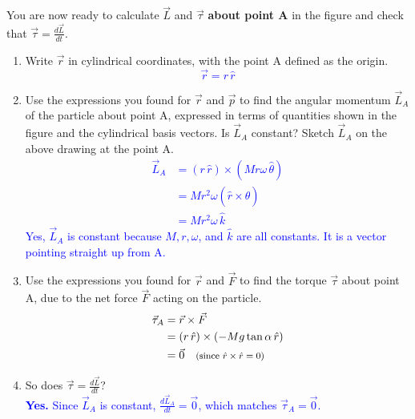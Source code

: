\documentclass[11pt, letterpaper, openany]{book}
\newenvironment{exercise}[1][Exercise]{%
  \tcolorbox[blanker, breakable, left=1em,
    before skip=1em, after skip=1em,
    borderline west={3pt}{0pt}{PhysNavy},
    colback=PhysCream,
    before upper={\textcolor{PhysNavy}{\sffamily\bfseries #1:}\space}
  ]%
}{%
  \endtcolorbox%
}
\begin{document}
\begin{exercise}[Exercise 9]
You are now ready to calculate $\vec{L}$ and $\vec{\tau}$ \textbf{about point A} in the figure and check that $\vec{\tau} = \frac{d\vec{L}}{dt}$.
\begin{enumerate}[label=(\alph*)]
    \item Write $\vec{r}$ in cylindrical coordinates, with the point A defined as the origin. \\
    \textcolor{blue}{\[ \vec{r} = r\,\hat{r} \]}
    
    \item Use the expressions you found for $\vec{r}$ and $\vec{p}$ to find the angular momentum $\vec{L}_A$ of the particle about point A, expressed in terms of quantities shown in the figure and the cylindrical basis vectors. Is $\vec{L}_A$ constant? Sketch $\vec{L}_A$ on the above drawing at the point A. \\
    \textcolor{blue}{
    \begin{align*}
        \vec{L}_A &= (r\,\hat{r}) \times (Mr\omega\,\hat{\theta}) \\
        &= Mr^2\omega (\hat{r} \times \hat{\theta}) \\
        &= Mr^2\omega\,\hat{k}
    \end{align*}
    Yes, $\vec{L}_A$ is constant because $M, r, \omega$, and $\hat{k}$ are all constants. It is a vector pointing straight up from A.
    }
    
    \item Use the expressions you found for $\vec{r}$ and $\vec{F}$ to find the torque $\vec{\tau}$ about point A, due to the net force $\vec{F}$ acting on the particle. \\
    \textcolor{blue}{
    \begin{align*}
        \vec{\tau}_A &= \vec{r} \times \vec{F} \\
        &= (r\,\hat{r}) \times (-Mg\tan\alpha\,\hat{r}) \\
        &= \vec{0} \quad \text{\footnotesize{(since $\hat{r} \times \hat{r} = 0$)}}
    \end{align*}
    }
    
    \item So does $\vec{\tau} = \frac{d\vec{L}}{dt}$? \\
    \textcolor{blue}{\textbf{Yes.} Since $\vec{L}_A$ is constant, $\frac{d\vec{L}_A}{dt} = \vec{0}$, which matches $\vec{\tau}_A = \vec{0}$.}
\end{enumerate}
\end{exercise}
\end{document}
